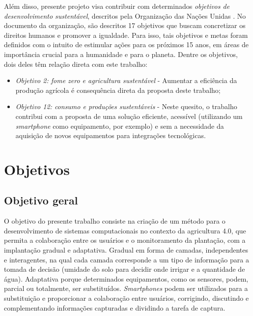 \documentclass[12pt]{article}
\begin{document}
Além disso, presente projeto visa contribuir com determinados \textit{objetivos de desenvolvimento sustentável}, descritos pela Organização das Nações Unidas \cite{ONU:2020}. No documento da organização, são descritos 17 objetivos que buscam concretizar os direitos humanos e promover a igualdade. Para isso, tais objetivos e metas foram definidos com o intuito de estimular ações para os próximos 15 anos, em áreas de importância crucial para a humanidade e para o planeta. Dentre os objetivos, dois deles têm relação direta com este trabalho:

\begin{itemize}
	\item \textit{Objetivo 2: fome zero e agricultura sustentável} - Aumentar a eficiência da produção agrícola é consequência direta da proposta deste trabalho;
	\item \textit{Objetivo 12: consumo e produções sustentáveis} - Neste quesito, o trabalho contribui com a proposta de uma solução eficiente, acessível (utilizando um \textit{smartphone} como equipamento, por exemplo) e sem a necessidade da aquisição de novos equipamentos para integrações tecnológicas.
\end{itemize}

\section{Objetivos}
\label{sec:objetivos}

\subsection{Objetivo geral}
\label{subsec:objetivo_geral}

O objetivo do presente trabalho consiste na criação de um método para o desenvolvimento de sistemas computacionais no contexto da agricultura 4.0, que permita a colaboração entre os usuários e o monitoramento da plantação, com a implantação gradual e adaptativa. Gradual em forma de camadas, independentes e interagentes, na qual cada camada corresponde a um tipo de informação para a tomada de decisão (umidade do solo para decidir onde irrigar e a quantidade de água). Adaptativa porque determinados equipamentos, como os sensores, podem, parcial ou totalmente, ser substituídos. \textit{Smartphones} podem ser utilizados para a substituição e proporcionar a colaboração entre usuários, corrigindo, discutindo e complementando informações capturadas e dividindo a tarefa de captura.
\end{document}
